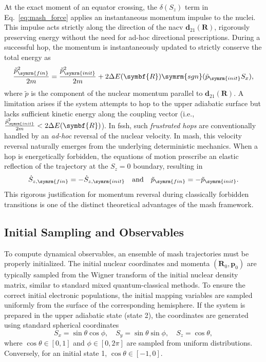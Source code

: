 At the exact moment of an equator crossing, the $\delta(S_z)$ term in Eq.~\eqref{eq:mash_force} applies an instantaneous momentum impulse to the nuclei. This impulse acts strictly along the direction of the \gls{nacv} $\symbf{d}_{21}(\symbf{R})$, rigorously preserving energy without the need for ad-hoc directional prescriptions. During a successful hop, the momentum is instantaneously updated to strictly conserve the total energy as
\begin{equation}
\frac{\tilde{p}_{\symrm{fin}}^2}{2m}=\frac{\tilde{p}_{\symrm{init}}^2}{2m}+2\Delta E(\symbf{R})\symrm{sgn}(\tilde{p}_{\symrm{init}}S_x),
\end{equation}
where $\tilde{p}$ is the component of the nuclear momentum parallel to $\symbf{d}_{21}(\symbf{R})$. A limitation arises if the system attempts to hop to the upper adiabatic surface but lacks sufficient kinetic energy along the coupling vector (i.e., $\frac{\tilde{p}_{\symrm{init}}^2}{2m}<2\Delta E(\symbf{R})$). In \gls{fssh}, such \textit{frustrated hops} are conventionally handled by an \textit{ad-hoc} reversal of the nuclear velocity. In \gls{mash}, this velocity reversal naturally emerges from the underlying deterministic mechanics. When a hop is energetically forbidden, the equations of motion prescribe an elastic reflection of the trajectory at the $S_z=0$ boundary, resulting in
\begin{equation}
\dot{S}_{z,\symrm{fin}}=-\dot{S}_{z,\symrm{init}}\quad\text{and}\quad\tilde{p}_{\symrm{fin}}=-\tilde{p}_{\symrm{init}}.
\end{equation}
This rigorous justification for momentum reversal during classically forbidden transitions is one of the distinct theoretical advantages of the \gls{mash} framework.
\subsection{Initial Sampling and Observables}
To compute dynamical observables, an ensemble of \gls{mash} trajectories must be properly initialized. The initial nuclear coordinates and momenta $(\symbf{R}_0,\symbf{p}_0)$ are typically sampled from the Wigner transform of the initial nuclear density matrix, similar to standard mixed quantum-classical methods. To ensure the correct initial electronic populations, the initial mapping variables are sampled uniformly from the surface of the corresponding hemisphere. If the system is prepared in the upper adiabatic state (state 2), the coordinates are generated using standard spherical coordinates
\begin{equation}
S_x=\sin\theta\cos\phi,\quad S_y=\sin\theta\sin\phi,\quad S_z=\cos\theta,
\end{equation}
where $\cos\theta\in[0, 1]$ and $\phi\in[0,2\pi]$ are sampled from uniform distributions. Conversely, for an initial state 1, $\cos\theta\in[-1, 0]$.


